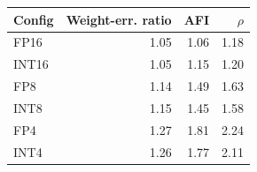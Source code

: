 \setlength{\tabcolsep}{3.5pt}
\begin{tabular}{lrrr}
\toprule
Config & Weight-err. ratio & AFI & $\rho$ \\
\midrule
FP16 & 1.05 & 1.06 & 1.18 \\
INT16 & 1.05 & 1.15 & 1.20 \\
FP8 & 1.14 & 1.49 & 1.63 \\
INT8 & 1.15 & 1.45 & 1.58 \\
FP4 & 1.27 & 1.81 & 2.24 \\
INT4 & 1.26 & 1.77 & 2.11 \\
\bottomrule
\end{tabular}
